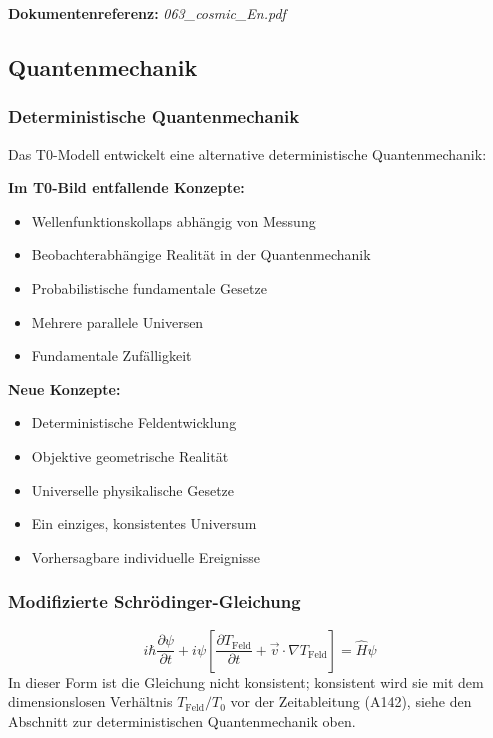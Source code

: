 \textbf{Dokumentenreferenz:} \textit{063\_cosmic\_En.pdf}

\subsection{Quantenmechanik}

\subsubsection{Deterministische Quantenmechanik}

Das T0-Modell entwickelt eine alternative deterministische Quantenmechanik:

\textbf{Im T0-Bild entfallende Konzepte:}
\begin{itemize}
	\item Wellenfunktionskollaps abhängig von Messung
	\item Beobachterabhängige Realität in der Quantenmechanik
	\item Probabilistische fundamentale Gesetze
	\item Mehrere parallele Universen
	\item Fundamentale Zufälligkeit
\end{itemize}

\textbf{Neue Konzepte:}
\begin{itemize}
	\item Deterministische Feldentwicklung
	\item Objektive geometrische Realität
	\item Universelle physikalische Gesetze
	\item Ein einziges, konsistentes Universum
	\item Vorhersagbare individuelle Ereignisse
\end{itemize}

\subsubsection{Modifizierte Schrödinger-Gleichung}

\begin{equation}
	i\hbar\frac{\partial\psi}{\partial t} + i\psi\left[\frac{\partial T_{\text{Feld}}}{\partial t} + \vec{v} \cdot \nabla T_{\text{Feld}}\right] = \hat{H}\psi
\end{equation}
In dieser Form ist die Gleichung nicht konsistent; konsistent wird sie mit dem dimensionslosen Verhältnis $T_{\text{Feld}}/T_0$ vor der Zeitableitung (A142), siehe den Abschnitt zur deterministischen Quantenmechanik oben.

